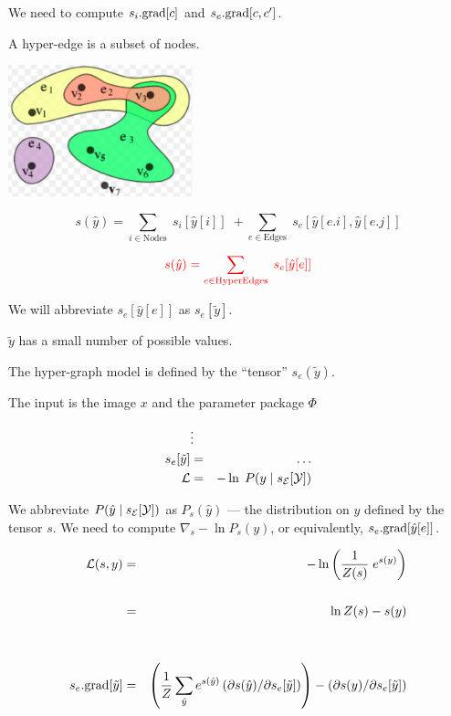 {\vfill
We need to compute {\color{red} $s_i.\mathrm{grad}[c]$} and {\color{red} $s_e.\mathrm{grad}[c,c']$}.


A hyper-edge is a subset of nodes.

\vfill
\centerline{\includegraphics[height = 1.5in]{../images/HyperGraph}}


$$s(\hat{y}) = \sum_{i \in \mathrm{Nodes}}\; s_i[\hat{y}[i]]\; + \sum_{e \in \mathrm{Edges}}\;s_e[\hat{y}[e.i],\hat{y}[e.j]]$$

\vfill

$${\color{red} s(\hat{y}) = \sum_{e \in \mathrm{HyperEdges}}  \; s_e[\hat{y}[e]]}$$



We will abbreviate $s_e[\hat{y}[e]]$ as {\color{red} $s_e[\tilde{y}]$}.

\vfill
{\color{red} $\tilde{y}$ has a small number of possible values.}

\vfill
The hyper-graph model is defined by the ``tensor'' {\color{red} $s_e(\tilde{y})$}.



The input is the image $x$ and the parameter package $\Phi$

\begin{eqnarray*}
 & \vdots & \\
s_e[\tilde{y}] & = & \ldots \\
{\cal L} & = & - \ln\; P(y\;|\;s_{\cal E}[{\cal Y}])
\end{eqnarray*}

\vfill We abbreviate $P(\hat{y}\;|\;s_{\cal E}[{\cal Y}])$ as {\color{red} $P_s(\hat{y})$} --- the distribution on $\hat{y}$ defined by the tensor $s$.
\vfill
We need to compute {\color{red} $\nabla_s -\ln P_s(y)$}, or equivalently, {\color{red} $s_e.\mathrm{grad}[\hat{y}[e]]$}.


\begin{eqnarray*}
  {\cal L}(s,y) & = & - \ln \left(\frac{1}{Z(s)}\;e^{s(y)}\right) \\
  \\
  & = & \ln Z(s) - s(y) \\
  \\
  \\
  s_e.\mathrm{grad}[\tilde{y}]
    & = & \left(\frac{1}{Z} \sum_{\hat{y}} e^{s(\hat{y})} \left(\partial s(\hat{y})/\partial s_e[\tilde{y}]\right)\right)
    - \left(\partial s(y) /\partial s_e[\tilde{y}]\right)
\end{eqnarray*}

}
